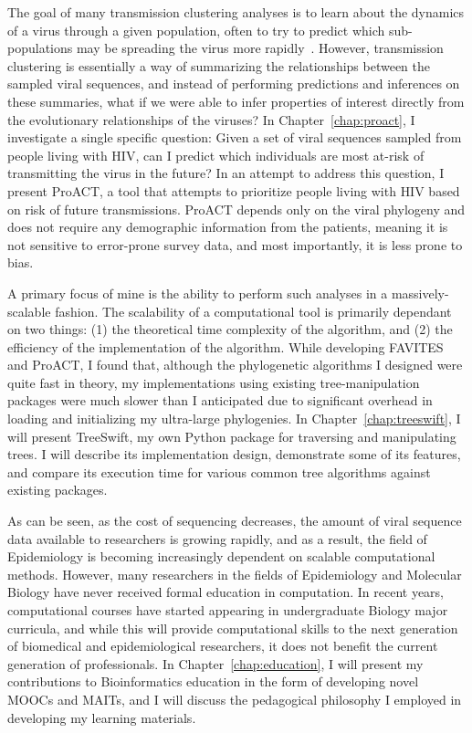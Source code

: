 The goal of many transmission clustering analyses is to learn about the dynamics of a virus through a given population, often to try to predict which sub-populations may be spreading the virus more rapidly~\cite{Wertheim2011,Wertheim2017,Little2014}. However, transmission clustering is essentially a way of summarizing the relationships between the sampled viral sequences, and instead of performing predictions and inferences on these summaries, what if we were able to infer properties of interest directly from the evolutionary relationships of the viruses? In Chapter~\ref{chap:proact}, I investigate a single specific question: Given a set of viral sequences sampled from people living with \gls{HIV}, can I predict which individuals are most at-risk of transmitting the virus in the future? In an attempt to address this question, I present ProACT, a tool that attempts to prioritize people living with \gls{HIV} based on risk of future transmissions. ProACT depends only on the viral phylogeny and does not require any demographic information from the patients, meaning it is not sensitive to error-prone survey data, and most importantly, it is less prone to bias.

A primary focus of mine is the ability to perform such analyses in a massively-scalable fashion. The scalability of a computational tool is primarily dependant on two things: (1) the theoretical time complexity of the algorithm, and (2) the efficiency of the implementation of the algorithm. While developing FAVITES and ProACT, I found that, although the phylogenetic algorithms I designed were quite fast in theory, my implementations using existing tree-manipulation packages were much slower than I anticipated due to significant overhead in loading and initializing my ultra-large phylogenies. In Chapter~\ref{chap:treeswift}, I will present TreeSwift, my own Python package for traversing and manipulating trees. I will describe its implementation design, demonstrate some of its features, and compare its execution time for various common tree algorithms against existing packages.

As can be seen, as the cost of sequencing decreases, the amount of viral sequence data available to researchers is growing rapidly, and as a result, the field of Epidemiology is becoming increasingly dependent on scalable computational methods. However, many researchers in the fields of Epidemiology and Molecular Biology have never received formal education in computation. In recent years, computational courses have started appearing in undergraduate Biology major curricula, and while this will provide computational skills to the next generation of biomedical and epidemiological researchers, it does not benefit the current generation of professionals. In Chapter~\ref{chap:education}, I will present my contributions to Bioinformatics education in the form of developing novel \glspl{MOOC} and \glspl{MAIT}, and I will discuss the pedagogical philosophy I employed in developing my learning materials.


